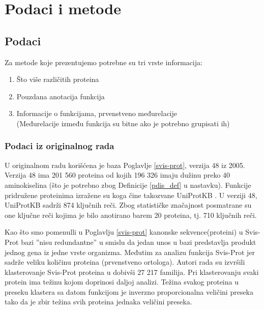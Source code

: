 
\chapter{Podaci i metode} %

\label{Podaci i metode} %



\section {Podaci}

Za metode koje prezentujemo potrebne su tri vrste informacija:
\begin{enumerate}
  \item Što više različitih proteina
  \item Pouzdana anotacija funkcija
  \item Informacije o funkcijama, prvenstveno međurelacije\\
    (Međurelacije između funkcija su bitne  ako je potrebno grupisati ih)
\end{enumerate}


\subsection{Podaci iz originalnog rada}

U originalnom radu \parencite{Xie2007} korišćena je  baza 
 Poglavlje \ref{svis-prot}, verzija 48 iz 2005.
Verzija 48 ima 201 560 proteina od kojih 196 326 imaju dužinu preko 40
aminokiselina (što je potrebno zbog Definicije \ref{pdis_def} u nastavku). Funkcije
pridružene proteinima izražene su 
 koga čine takozvane UniProtKB 
. U verziji 48, UniProtKB sadrži 874 ključnih reči.  Zbog
statističke značajnost posmatrane su one ključne reči kojima je bilo anotirano
barem 20 proteina, tj. 710 ključnih reči.

Kao što smo pomenulli u Poglavlju \ref{svis-prot} kanonske sekvence(proteini) u Svis-Prot
bazi ''nisu redundantne'' u smislu da jedan unos u bazi predstavlja produkt
jednog gena iz jedne vrste organizma. Međutim za analizu funkcija
Svis-Prot  \parencite{proveriti} jer
sadrže veliku količinu  proteina (prvenstveno ortologa).
Autori rada \parencite{Xie2007} su izvršili klasterovanje Svis-Prot
proteina u  dobivši 27 217 familija. Pri klasterovanju svaki protein
ima težinu kojom doprinosi daljoj analizi. Težina svakog proteina u preseku
klastera sa datom funkcijom je inverzno proporcionalna veličini preseka
tako da je zbir težina svih proteina jednaka veličini preseka.

